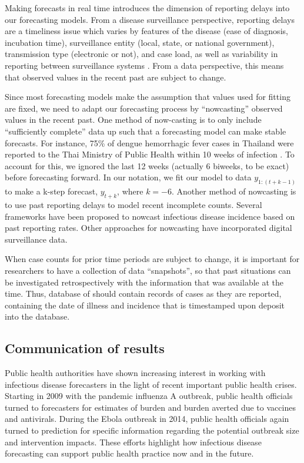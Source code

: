 \documentclass[a4paper]{article}
\begin{document}
Making forecasts in real time introduces the dimension of reporting delays into our forecasting models.
From a disease surveillance perspective, reporting delays are a timeliness issue which varies by features of the disease (ease of diagnosis, incubation time), surveillance entity (local, state, or national government), transmission type (electronic or not), and case load, as well as variability in reporting between surveillance systems \cite{Jajosky2004, BonacicMarinovic2015}.
From a data perspective, this means that observed values in the recent past are subject to change.

Since most forecasting models make the assumption that values used for fitting are fixed, we need to adapt our forecasting process by ``nowcasting'' observed values in the recent past.
One method of now-casting is to only include ``sufficiently complete'' data up such that a forecasting model can make stable forecasts.
For instance, 75\% of dengue hemorrhagic fever cases in Thailand were reported to the Thai Ministry of Public Health within 10 weeks of infection \cite{Reich2016a}.
To account for this, we ignored the last 12 weeks (actually 6 biweeks, to be exact) before forecasting forward.
In our notation, we fit our model to data $y_{1:(t+k-1)}$ to make a k-step forecast, $y_{t+k}$, where $k=-6$.
Another method of nowcasting is to use past reporting delays to model recent incomplete counts.
Several frameworks have been proposed to nowcast infectious disease incidence based on past reporting rates.\cite{Hohle2014,bastos2019modelling}
Other approaches for nowcasting have incorporated digital surveillance data.\cite{brooks2018nonmechanistic,osthus2019even}

When case counts for prior time periods are subject to change, it is important for researchers to have a collection of data ``snapshots'', so that past situations can be investigated retrospectively with the information that was available at the time.
Thus, database of should contain records of cases as they are reported, containing the date of illness and incidence that is timestamped upon deposit into the database.

\subsection{Communication of results}

Public health authorities have shown increasing interest in working with infectious disease forecasters in the light of recent important public health crises.
Starting in 2009 with the pandemic influenza A outbreak, public health officials turned to forecasters for estimates of burden and burden averted due to vaccines and antivirals.  
During the Ebola outbreak in 2014, public health officials again turned to prediction for specific information regarding the potential outbreak size and intervention impacts.  
These efforts highlight how infectious disease forecasting can support public health practice now and in the future.
\end{document}
